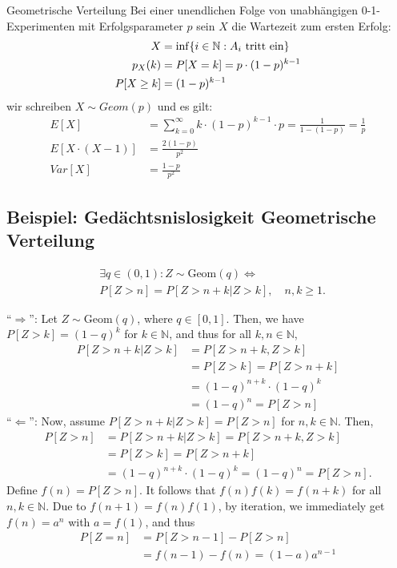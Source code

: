 \begin{definition}{Geometrische Verteilung}
Bei einer unendlichen Folge von unabhängigen 0-1-Experimenten mit
Erfolgsparameter $p$ sein $X$ die Wartezeit zum ersten Erfolg:
\begin{align*}
  X       & = \inf \{ i \in \mathbb{N} : A_i \text{ tritt ein} \} \\
  p_X (k) & = P[X = k] = p \cdot  (1-p)^{k-1}\\
  P[X \geq k] &= (1 - p)^{k - 1}
\end{align*}
wir schreiben $X \sim Geom (p)$ und es gilt:
\begin{align*}
  E[X]              & = \sum_{k = 0}^\infty  k \cdot (1-p)^{k-1} \cdot p
  = \frac{1}{1- (1-p)} = \frac{1}{p}                 \\
  E[X \cdot  (X-1)] & = \frac{2 (1-p)}{p^2}          \\
  Var[X]            & = \frac{1-p}{p^2}
\end{align*}
\end{definition}
\BoxStart{}
\subsection{Beispiel: Gedächtsnislosigkeit Geometrische Verteilung}
\begin{align*}
  &\exists q \in (0, 1) : Z \sim \text{Geom}(q) \Leftrightarrow \\
  &P[Z > n] = P[Z > n + k | Z > k], \quad n, k \geq 1.
\end{align*}

``$\Rightarrow$'': Let $Z \sim \text{Geom}(q)$, where $q \in [0, 1]$. Then, we have $P[Z > k] = (1 - q)^k$ for $k \in \mathbb{N}$, and thus for all $k, n \in \mathbb{N}$,
\begin{align*}
P[Z > n + k | Z > k] &= P[Z > n + k, Z > k] \\
&= P[Z > k] = P[Z > n + k] \\
&= (1 - q)^{n+k} \cdot (1 - q)^k \\
&= (1 - q)^n = P[Z > n]
\end{align*}
``$\Leftarrow$'': Now, assume $P[Z > n + k | Z > k] = P[Z > n]$ for $n, k \in \mathbb{N}$. Then,
\begin{align*}
P[Z > n] &= P[Z > n + k | Z > k] = P[Z > n + k, Z > k] \\
&= P[Z > k] = P[Z > n + k] \\
&= (1 - q)^{n+k} \cdot (1 - q)^k = (1 - q)^n = P[Z > n].
\end{align*}
Define $f(n) = P[Z > n]$. It follows that $f(n)f(k) = f(n + k)$ for all $n, k \in \mathbb{N}$. Due to $f(n + 1) = f(n)f(1)$, by iteration, we immediately get $f(n) = a^n$ with $a = f(1)$, and thus
\begin{align*}
  P[Z = n] &= P[Z > n - 1] - P[Z > n]\\
  &= f(n - 1) - f(n) = (1 - a)a^{n-1}
\end{align*}

